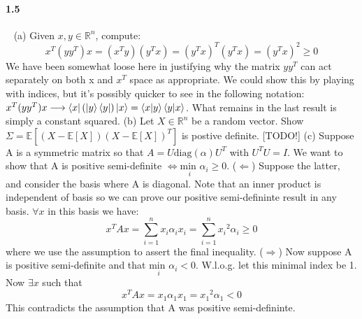 \documentclass{article}
\begin{document}
\paragraph{1.5}\ \newline
(a) Given $x,y \in \mathds{R}^n$, compute: 
\begin{equation}
  x^T (y y^T) x = ( x^T y ) ( y^T x ) = (y^T x)^T (y^T x) = (y^T x)^2 \ge 0
\end{equation}
We have been somewhat loose here in justifying why the matrix $y y^T$ can act separately on both x and $x^T$ space as appropriate. We could show this by playing with indices, but it's possibly quicker to see in the following notation: $x^T (yy^T) x \longrightarrow \bra{x}(\ket{y}\bra{y})\ket{x} = \bra{x}\ket{y}\bra{y}\ket{x} $. What remains in the last result is simply a constant squared.
\newline 
\newline
(b) Let $X \in \mathds{R}^n$ be a random vector. Show $\Sigma = \mathds{E}[(X-\mathds{E}[X])(X-\mathds{E}[X])^T]$ is postive definite.
[TODO!]
\newline
\newline
(c) Suppose A is a symmetric matrix so that $A=U\text{diag}(\alpha)U^T$ with $U^TU=I$. We want to show that A is positive semi-definite $\Leftrightarrow \underset{i}{\text{min }}\alpha_i \ge 0$.
\newline
($\Leftarrow$) Suppose the latter, and consider the basis where A is diagonal. Note that an inner product is independent of basis so we can prove our positive semi-defininte result in any basis. $\forall x$ in this basis we have:
\begin{equation}
    x^T A x = \sum_{i=1}^{n} x_i \alpha_i x_i = \sum_{i=1}^{n} {x_i}^2 \alpha_i \ge 0
\end{equation}
where we use the assumption to assert the final inequality.
\newline
($\Rightarrow$) Now suppose A is positive semi-definite and that $\underset{i}{\text{min }}\alpha_i < 0$. W.l.o.g. let this minimal index be 1. Now $\exists x$ such that
\begin{equation}
    x^T A x = x_1 \alpha_1 x_1 = {x_1}^2 \alpha_1 < 0
\end{equation}
This contradicts the assumption that A was positive semi-defininte.
\end{document}
